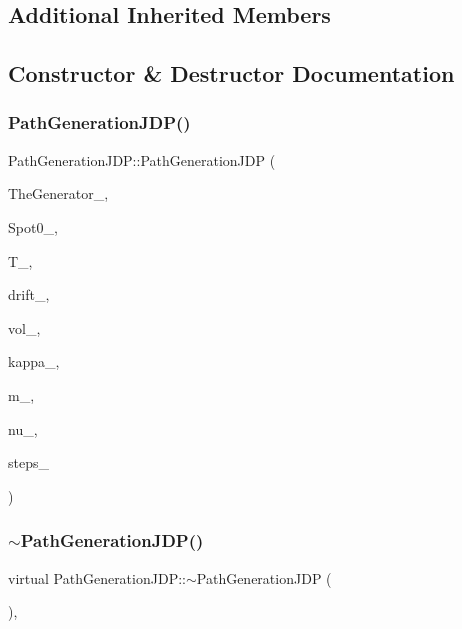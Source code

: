 \subsection*{Additional Inherited Members}


\subsection{Constructor \& Destructor Documentation}
\hypertarget{classPathGenerationJDP_a156a05885d03359d4487f15888378f1d}{}\label{classPathGenerationJDP_a156a05885d03359d4487f15888378f1d} 
\subsubsection{\texorpdfstring{Path\+Generation\+J\+D\+P()}{PathGenerationJDP()}}
{\footnotesize\ttfamily Path\+Generation\+J\+D\+P\+::\+Path\+Generation\+J\+DP (\begin{DoxyParamCaption}\item[{shared\+\_\+ptr$<$ \hyperlink{classRandomBase}{Random\+Base} $>$}]{The\+Generator\+\_\+,  }\item[{double}]{Spot0\+\_\+,  }\item[{double}]{T\+\_\+,  }\item[{const \hyperlink{classParameters}{Parameters} \&}]{drift\+\_\+,  }\item[{const \hyperlink{classParameters}{Parameters} \&}]{vol\+\_\+,  }\item[{double}]{kappa\+\_\+,  }\item[{double}]{m\+\_\+,  }\item[{double}]{nu\+\_\+,  }\item[{unsigned long}]{steps\+\_\+ }\end{DoxyParamCaption})}

\hypertarget{classPathGenerationJDP_a2820c450810a38be8de022f7bc84a110}{}\label{classPathGenerationJDP_a2820c450810a38be8de022f7bc84a110} 
\subsubsection{\texorpdfstring{$\sim$\+Path\+Generation\+J\+D\+P()}{~PathGenerationJDP()}}
{\footnotesize\ttfamily virtual Path\+Generation\+J\+D\+P\+::$\sim$\+Path\+Generation\+J\+DP (\begin{DoxyParamCaption}{ }\end{DoxyParamCaption})\hspace{0.3cm}{\ttfamily [inline]}, {\ttfamily [virtual]}}



